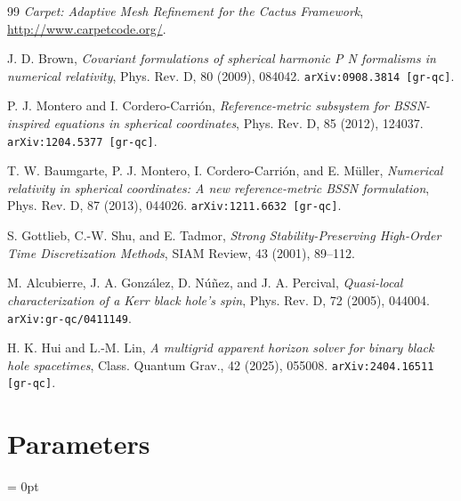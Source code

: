 \documentclass[a4paper,11pt]{article}
\newlength{\tableWidth} \newlength{\maxVarWidth} \newlength{\paraWidth} \newlength{\descWidth}
\begin{document}
\begin{thebibliography}{99}
    {{\em Carpet: Adaptive Mesh Refinement for the Cactus Framework},
    \url{http://www.carpetcode.org/}.}

    {J. D. Brown,
    {\em Covariant formulations of spherical harmonic P N formalisms in numerical relativity},
    Phys. Rev. D, 80 (2009), 084042. \texttt{arXiv:0908.3814 [gr-qc]}.}

    {P. J. Montero and I. Cordero-Carri{\'o}n,
    {\em Reference-metric subsystem for BSSN-inspired equations in spherical coordinates},
    Phys. Rev. D, 85 (2012), 124037. \texttt{arXiv:1204.5377 [gr-qc]}.}

    {T. W. Baumgarte, P. J. Montero, I. Cordero-Carri{\'o}n, and E. M{\"u}ller,
    {\em Numerical relativity in spherical coordinates: A new reference-metric BSSN formulation},
    Phys. Rev. D, 87 (2013), 044026. \texttt{arXiv:1211.6632 [gr-qc]}.}

    {S. Gottlieb, C.-W. Shu, and E. Tadmor,
    {\em Strong Stability-Preserving High-Order Time Discretization Methods},
    SIAM Review, 43 (2001), 89--112.}

    {M. Alcubierre, J. A. Gonz{\'a}lez, D. N{\'u}{\~n}ez, and J. A. Percival,
    {\em Quasi-local characterization of a Kerr black hole's spin},
    Phys. Rev. D, 72 (2005), 044004. \texttt{arXiv:gr-qc/0411149}.}

    {H. K. Hui and L.-M. Lin,
    {\em A multigrid apparent horizon solver for binary black hole spacetimes},
    Class. Quantum Grav., 42 (2025), 055008. \texttt{arXiv:2404.16511 [gr-qc]}.}

\end{thebibliography}



\section{Parameters} 


\parskip = 0pt

\setlength{\tableWidth}{160mm}

\setlength{\paraWidth}{\tableWidth}
\setlength{\descWidth}{\tableWidth}
\settowidth{\maxVarWidth}{bah\_enable\_eta\_varying\_alg\_for\_precision\_common\_horizon}

\addtolength{\paraWidth}{-\maxVarWidth}
\addtolength{\paraWidth}{-\columnsep}
\addtolength{\paraWidth}{-\columnsep}
\addtolength{\paraWidth}{-\columnsep}
\end{document}
